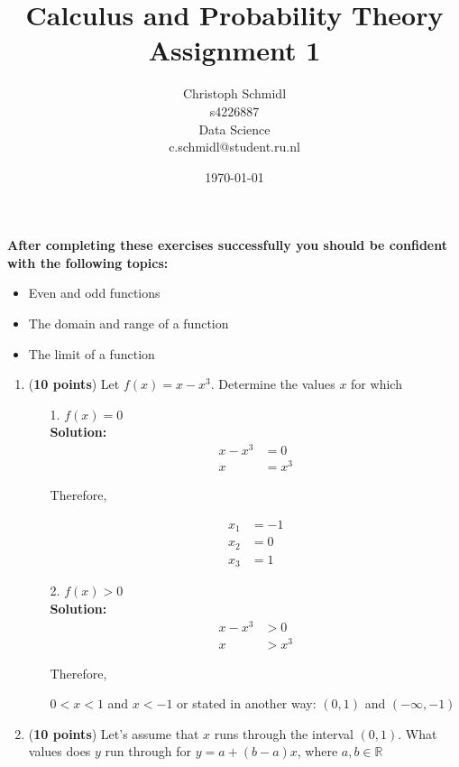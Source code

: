 \documentclass[a4paper]{article}
\title{Calculus and Probability Theory\\ Assignment 1}
\author{Christoph Schmidl\\
s4226887\\
Data Science\\
c.schmidl@student.ru.nl\\}
\date{\today}
\begin{document}
\maketitle

\textbf{After completing these exercises successfully you should be confident with the following topics:}

\begin{itemize}
	\item Even and odd functions
	\item The domain and range of a function
	\item The limit of a function
\end{itemize}
\vspace{1em}

\begin{enumerate}

\item (\textbf{10 points}) Let $f(x) = x - x^3$. Determine the values $x$ for which


\begin{enumerate}
	\item[1.] $f(x) = 0$\\
	\textbf{Solution:}\\
	
	\begin{align*}
		x - x^3 &= 0\\
		x &= x^3
	\end{align*}

Therefore, 

\begin{align*}
	x_1 &= -1\\
	x_2 &= 0\\
	x_3 &= 1
\end{align*}
		
	\item[2.] $f(x) > 0$\\
	\textbf{Solution:}\\
	
		\begin{align*}
		x - x^3 &> 0\\
		x &> x^3
	\end{align*}
	
Therefore, 

$0 < x < 1$ and $x < -1$ or stated in another way: $(0,1)$ and $(-\infty,-1)$	

\end{enumerate}


\item (\textbf{10 points}) Let's assume that $x$ runs through the interval $(0,1)$. What values does $y$ run through for $y = a + (b - a)x$, where $a,b \in \mathbb{R}$


\end{enumerate}
\end{document}
